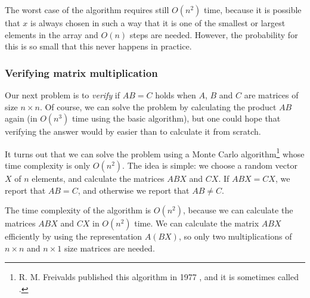 The worst case of the algorithm requires still $O(n^2)$ time,
because it is possible that $x$ is always chosen
in such a way that it is one of the smallest or largest
elements in the array and $O(n)$ steps are needed.
However, the probability for this is so small
that this never happens in practice.

\subsubsection{Verifying matrix multiplication}


Our next problem is to \emph{verify}
if $AB=C$ holds when $A$, $B$ and $C$
are matrices of size $n \times n$.
Of course, we can solve the problem
by calculating the product $AB$ again
(in $O(n^3)$ time using the basic algorithm),
but one could hope that verifying the
answer would by easier than to calculate it from scratch.

It turns out that we can solve the problem
using a Monte Carlo algorithm\footnote{R. M. Freivalds published
    this algorithm in 1977 \cite{fre77}, and it is sometimes
    called  .} whose
time complexity is only $O(n^2)$.
The idea is simple: we choose a random vector
$X$ of $n$ elements, and calculate the matrices
$ABX$ and $CX$. If $ABX=CX$, we report that $AB=C$,
and otherwise we report that $AB \neq C$.

The time complexity of the algorithm is
$O(n^2)$, because we can calculate the matrices
$ABX$ and $CX$ in $O(n^2)$ time.
We can calculate the matrix $ABX$ efficiently
by using the representation $A(BX)$, so only two
multiplications of $n \times n$ and $n \times 1$
size matrices are needed.

